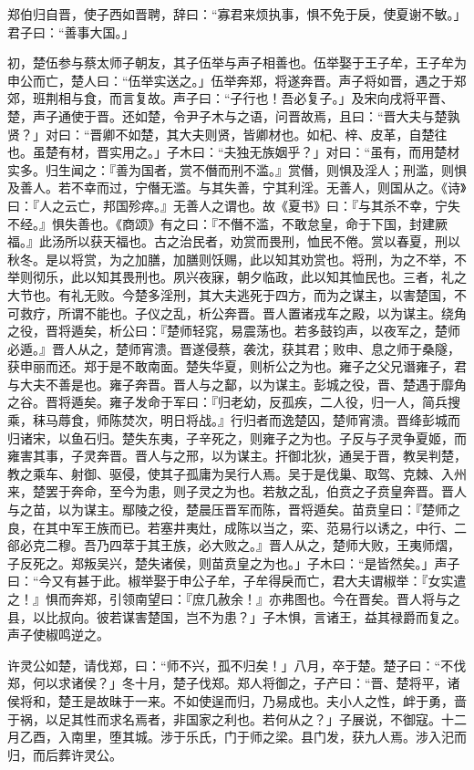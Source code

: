 \documentclass[]{article}
\begin{document}
郑伯归自晋，使子西如晋聘，辞曰：``寡君来烦执事，惧不免于戾，使夏谢不敏。」君子曰：``善事大国。」

初，楚伍参与蔡太师子朝友，其子伍举与声子相善也。伍举娶于王子牟，王子牟为申公而亡，楚人曰：``伍举实送之。」伍举奔郑，将遂奔晋。声子将如晋，遇之于郑郊，班荆相与食，而言复故。声子曰：``子行也！吾必复子。」及宋向戌将平晋、楚，声子通使于晋。还如楚，令尹子木与之语，问晋故焉，且曰：``晋大夫与楚孰贤？」对曰：``晋卿不如楚，其大夫则贤，皆卿材也。如杞、梓、皮革，自楚往也。虽楚有材，晋实用之。」子木曰：``夫独无族姻乎？」对曰：``虽有，而用楚材实多。归生闻之：『善为国者，赏不僭而刑不滥。』赏僭，则惧及淫人；刑滥，则惧及善人。若不幸而过，宁僭无滥。与其失善，宁其利淫。无善人，则国从之。《诗》曰：『人之云亡，邦国殄瘁。』无善人之谓也。故《夏书》曰：『与其杀不幸，宁失不经。』惧失善也。《商颂》有之曰：『不僭不滥，不敢怠皇，命于下国，封建厥福。』此汤所以获天福也。古之治民者，劝赏而畏刑，恤民不倦。赏以春夏，刑以秋冬。是以将赏，为之加膳，加膳则饫赐，此以知其劝赏也。将刑，为之不举，不举则彻乐，此以知其畏刑也。夙兴夜寐，朝夕临政，此以知其恤民也。三者，礼之大节也。有礼无败。今楚多淫刑，其大夫逃死于四方，而为之谋主，以害楚国，不可救疗，所谓不能也。子仪之乱，析公奔晋。晋人置诸戎车之殿，以为谋主。绕角之役，晋将遁矣，析公曰：『楚师轻窕，易震荡也。若多鼓钧声，以夜军之，楚师必遁。』晋人从之，楚师宵溃。晋遂侵蔡，袭沈，获其君；败申、息之师于桑隧，获申丽而还。郑于是不敢南面。楚失华夏，则析公之为也。雍子之父兄谮雍子，君与大夫不善是也。雍子奔晋。晋人与之鄐，以为谋主。彭城之役，晋、楚遇于靡角之谷。晋将遁矣。雍子发命于军曰：『归老幼，反孤疾，二人役，归一人，简兵搜乘，秣马蓐食，师陈焚次，明日将战。』行归者而逸楚囚，楚师宵溃。晋绛彭城而归诸宋，以鱼石归。楚失东夷，子辛死之，则雍子之为也。子反与子灵争夏姬，而雍害其事，子灵奔晋。晋人与之邢，以为谋主。扞御北狄，通吴于晋，教吴判楚，教之乘车、射御、驱侵，使其子孤庸为吴行人焉。吴于是伐巢、取驾、克棘、入州来，楚罢于奔命，至今为患，则子灵之为也。若敖之乱，伯贲之子贲皇奔晋。晋人与之苗，以为谋主。鄢陵之役，楚晨压晋军而陈，晋将遁矣。苗贲皇曰：『楚师之良，在其中军王族而已。若塞井夷灶，成陈以当之，栾、范易行以诱之，中行、二郤必克二穆。吾乃四萃于其王族，必大败之。』晋人从之，楚师大败，王夷师熠，子反死之。郑叛吴兴，楚失诸侯，则苗贲皇之为也。」子木曰：``是皆然矣。」声子曰：``今又有甚于此。椒举娶于申公子牟，子牟得戾而亡，君大夫谓椒举：『女实遣之！』惧而奔郑，引领南望曰：『庶几赦余！』亦弗图也。今在晋矣。晋人将与之县，以比叔向。彼若谋害楚国，岂不为患？」子木惧，言诸王，益其禄爵而复之。声子使椒鸣逆之。

许灵公如楚，请伐郑，曰：``师不兴，孤不归矣！」八月，卒于楚。楚子曰：``不伐郑，何以求诸侯？」冬十月，楚子伐郑。郑人将御之，子产曰：``晋、楚将平，诸侯将和，楚王是故昧于一来。不如使逞而归，乃易成也。夫小人之性，衅于勇，啬于祸，以足其性而求名焉者，非国家之利也。若何从之？」子展说，不御寇。十二月乙酉，入南里，堕其城。涉于乐氏，门于师之梁。县门发，获九人焉。涉入汜而归，而后葬许灵公。
\end{document}
